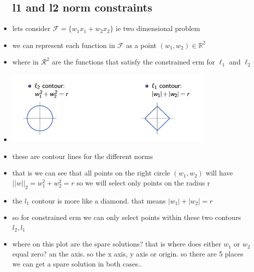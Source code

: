 \documentclass{article}
\begin{document}
\begin{itemize}
\subsection{l1 and l2 norm constraints}
\item lets consider $\mathcal{F}=\{w_1x_1+w_2x_2\}$ ie two dimensional problem  
\item we can represent each function in $\mathcal{F}$ as a point $(w_1,w_2)\in\mathbb{R}^{2}$
\item where in $\mathcal{R}^{2}$ are the functions that satisfy the constrained erm for $\ell_1$ and $\ell_{2}$
\item \includegraphics[width=10cm]{lecture_notes/lecture_3/immages/l3_5.jpg}
\item these are contour lines for the different norms 
\item that is we can see that all points on the right circle $(w_1,w_2)$ will have $||w||_{2}=w_1^2+w_2^2=r$ so we will select only points on the radius r
\item the $l_1$ contour is more like a diamond. that means $|w_1|+|w_2|=r$
\item so for constrained erm we can only select points within these two contours $l_2,l_1$
\item where on this plot are the spare solutions? that is where does either $w_1$ or $w_2$ equal zero? an the axis. so the x axis, y axis or origin. so there are 5 places we can get a spare solution in both cases.. 

\end{itemize}
\end{document}
